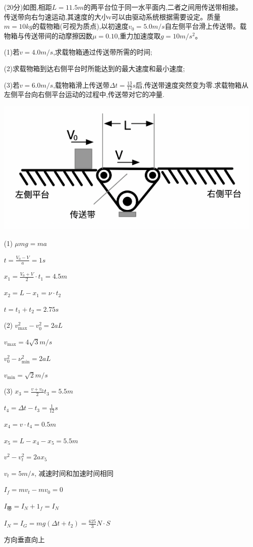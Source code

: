 \newpage
\question[6] (20分)如图,相距$L=11.5m$的两平台位于同一水平面内,二者之间用传送带相接。传送带向右匀速运动,其速度的大小v可以由驱动系统根据需要设定。质量$m=10kg$的载物箱(可视为质点),以初速度$v_0=5.0m/s$自左侧平台滑上传送带。载物箱与传送带间的动摩擦因数$μ=0.10$,重力加速度取$g=10m/s^2$。

(1)若$v=4.0m/s$,求载物箱通过传送带所需的时间;

(2)求载物箱到达右侧平台时所能达到的最大速度和最小速度;

(3)若$v=6.0m/s$,载物箱滑上传送带$\Delta t=\frac{13}{12}s$后,传送带速度突然变为零.求载物箱从左侧平台向右侧平台运动的过程中,传送带对它的冲量.\begin{center}\includegraphics[]{img/image10.png}\end{center}
\begin{solution}{4cm}
(1)
$μ mg = ma$

$t  = \frac{V_{0}-V}{a}=1s$

$x_{1}= \frac{V_{0}+V}{2} \cdot t_{1}=4.5m$

$x_{2}=L-x_{1}= \nu \cdot t_{2}$

$t=t_{1}+t_{2}=2.75s$

(2)
$v_{ \max }^{2}-v_{0}^{2}=2aL$

$v_{ \max }=4 \sqrt{3}m/s$

$v _{0}^{2}- \nu _{ \min }^{2}=2aL$

$v_{\min}= \sqrt{2}m/s$   

(3)
$x_{3}= \frac{v+v_{0}}{2}t_{3}=5.5m$

$t_{4}= \Delta t-t_{3}= \frac{1}{12}s$

$x _4 = v · t _4 = 0 . 5 m$

$x _5 = L - x _4- x _5 = 5 . 5 m$

$v ^2- v _t^ 2 = 2 ax _5$

$v_t = 5 m / s$, 减速时间和加速时间相同

$I _f = mv_t - mv _0 = 0$

$I_\text{带} = I _N +1 _f = I _N$

$I_{N}=I_{G}=mg( \Delta t+t_{2})= \frac{625}{3}N \cdot S$

方向垂直向上  
\end{solution}

